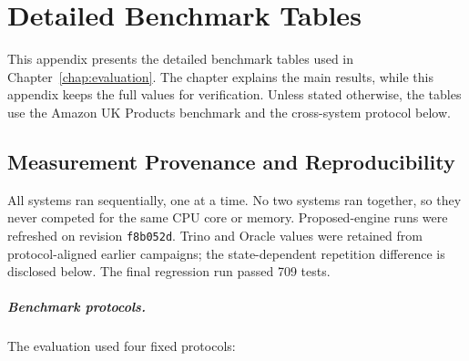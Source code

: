 
\chapter{Detailed Benchmark Tables}
\label{app:benchmark-tables}

This appendix presents the detailed benchmark tables used in
Chapter~\ref{chap:evaluation}.  The chapter explains the main results,
while this appendix keeps the full values for verification.  Unless
stated otherwise, the tables use the Amazon UK Products benchmark and
the cross-system protocol below.

\section{Measurement Provenance and Reproducibility}
\label{app:provenance}

All systems ran sequentially, one at a time.  No two systems ran
together, so they never competed for the same CPU core or memory.
Proposed-engine runs were refreshed on revision \texttt{f8b052d}.  Trino and
Oracle values were retained from protocol-aligned earlier campaigns;
the state-dependent repetition difference is disclosed below.  The
final regression run passed 709 tests.

\paragraph{Benchmark protocols.}
The evaluation used four fixed protocols:

